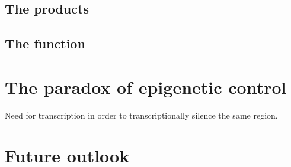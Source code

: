 \documentclass[a4paper, twocolumn]{article}
\begin{document}
\subsection{The products}

\subsection{The function}

\section{The paradox of epigenetic control}
Need for transcription in order to transcriptionally silence the same region. \cite{paradox}

\section{Future outlook}




\end{document}
